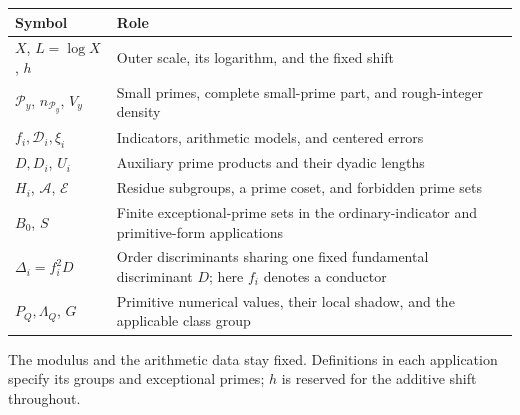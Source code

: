 \begin{center}\small
\begin{tabular}{@{}>{\raggedright\arraybackslash}p{.28\linewidth}>{\raggedright\arraybackslash}p{.66\linewidth}@{}}
\hline
Symbol&Role\\\hline
\(X\), \(L=\log X\), \(h\)&Outer scale, its logarithm, and the fixed shift\\
\(\mathcal P_y\), \(n_{\mathcal P_y}\), \(V_y\)&Small primes, complete small-prime part, and rough-integer density\\
\(f_i,\mathcal D_i,\xi_i\)&Indicators, arithmetic models, and centered errors\\
\(D,D_i\), \(U_i\)&Auxiliary prime products and their dyadic lengths\\
\(H_i\), \(\mathscr A\), \(\mathcal E\)&Residue subgroups, a prime coset, and forbidden prime sets\\
\(B_0\), \(S\)&Finite exceptional-prime sets in the ordinary-indicator and primitive-form applications\\
\(\Delta_i=f_i^2D\)&Order discriminants sharing one fixed fundamental discriminant \(D\); here \(f_i\) denotes a conductor\\
\(P_Q,\Lambda_Q\), \(G\)&Primitive numerical values, their local shadow, and the applicable class group\\\hline
\end{tabular}
\end{center}
The modulus and the arithmetic data stay fixed. Definitions in each
application specify its groups and exceptional primes; \(h\) is
reserved for the additive shift throughout.
